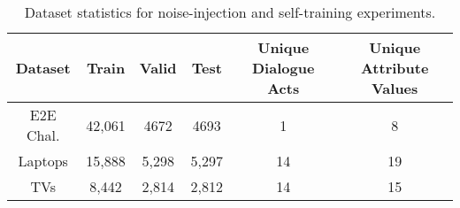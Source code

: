 \begin{table}
\centering
\begin{tabular}{ccc ccc}
\toprule
Dataset & Train & Valid & Test & Unique Dialogue Acts & Unique Attribute Values \\
\midrule
E2E Chal. & 42,061 & 4672 & 4693 & 1 & 8 \\
Laptops & 15,888 & 5,298 & 5,297 & 14 & 19\\
TVs & 8,442 & 2,814 & 2,812 & 14 & 15\\
\bottomrule
\end{tabular}
\caption{Dataset statistics for noise-injection and self-training 
experiments.}
\label{tab:fgds}
\end{table}
